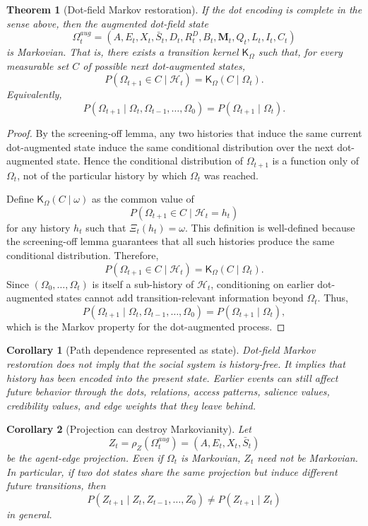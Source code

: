 \documentclass[11pt]{article}
\newtheorem{theorem}{Theorem}
\newtheorem{corollary}{Corollary}
\theoremstyle{remark}
\begin{document}
\begin{theorem}[Dot-field Markov restoration]\label{thm:dot-field-markov-restoration}
If the dot encoding is complete in the sense above, then the
augmented dot-field state
$$
\Omega_t^{aug}=(A,E_t,X_t,\bar S_t,D_t,R_t^D,B_t,\mathbf M_t,Q_t,L_t,I_t,C_t)
$$
is Markovian. That is, there exists a transition kernel
$\mathsf{K}_\Omega$ such that, for every measurable set $C$ of possible
next dot-augmented states,
$$
P(\Omega_{t+1}\in C\mid \mathcal{H}_t)
=
\mathsf{K}_\Omega(C\mid \Omega_t).
$$
Equivalently,
$$
P(\Omega_{t+1}\mid \Omega_t,\Omega_{t-1},\ldots,\Omega_0)
=
P(\Omega_{t+1}\mid \Omega_t).
$$
\end{theorem}

\begin{proof}
By the screening-off lemma, any two histories that induce the same
current dot-augmented state induce the same conditional distribution
over the next dot-augmented state. Hence the conditional distribution of
$\Omega_{t+1}$ is a function only of $\Omega_t$, not of the particular
history by which $\Omega_t$ was reached.

Define $\mathsf{K}_\Omega(C\mid \omega)$ as the common value of
$$
P(\Omega_{t+1}\in C\mid \mathcal{H}_t=h_t)
$$
for any history $h_t$ such that $\Xi_t(h_t)=\omega$. This definition is
well-defined because the screening-off lemma guarantees that all such
histories produce the same conditional distribution. Therefore,
$$
P(\Omega_{t+1}\in C\mid \mathcal{H}_t)=\mathsf{K}_\Omega(C\mid \Omega_t).
$$
Since $(\Omega_0,\ldots,\Omega_t)$ is itself a sub-history of
$\mathcal{H}_t$, conditioning on earlier dot-augmented states cannot add
transition-relevant information beyond $\Omega_t$. Thus,
$$
P(\Omega_{t+1}\mid \Omega_t,\Omega_{t-1},\ldots,\Omega_0)
=
P(\Omega_{t+1}\mid \Omega_t),
$$
which is the Markov property for the dot-augmented process.
\end{proof}

\begin{corollary}[Path dependence represented as state]
Dot-field Markov restoration does not imply that the social system is
history-free. It implies that history has been encoded into the present
state. Earlier events can still affect future behavior through the dots,
relations, access patterns, salience values, credibility values, and
edge weights that they leave behind.
\end{corollary}


\begin{corollary}[Projection can destroy Markovianity]
Let
$$
Z_t=\rho_Z(\Omega_t^{aug})=(A,E_t,X_t,\bar S_t)
$$
be the agent-edge projection. Even if $\Omega_t$ is Markovian, $Z_t$
need not be Markovian. In particular, if two dot states share the same
projection but induce different future transitions, then
$$
P(Z_{t+1}\mid Z_t,Z_{t-1},\ldots,Z_0)
\neq
P(Z_{t+1}\mid Z_t)
$$
in general.
\end{corollary}
\end{document}
